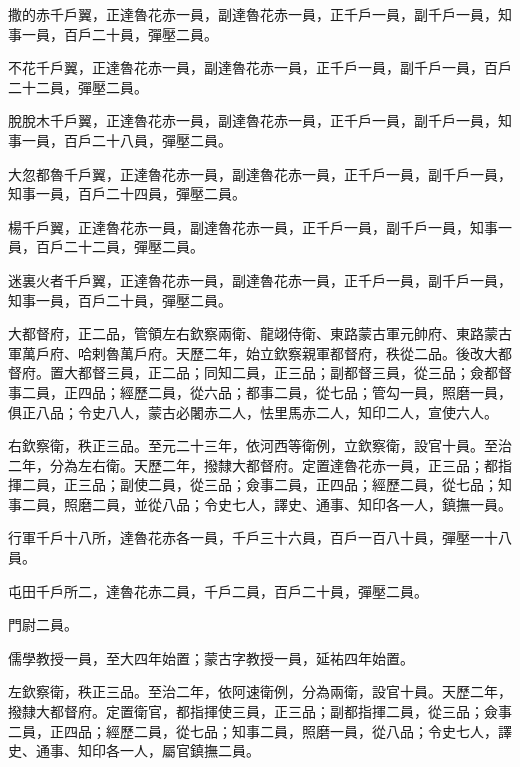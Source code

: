 \begin{pinyinscope}
 撒的赤千戶翼，正達魯花赤一員，副達魯花赤一員，正千戶一員，副千戶一員，知事一員，百戶二十員，彈壓二員。



 不花千戶翼，正達魯花赤一員，副達魯花赤一員，正千戶一員，副千戶一員，百戶二十二員，彈壓二員。



 脫脫木千戶翼，正達魯花赤一員，副達魯花赤一員，正千戶一員，副千戶一員，知事一員，百戶二十八員，彈壓二員。



 大忽都魯千戶翼，正達魯花赤一員，副達魯花赤一員，正千戶一員，副千戶一員，知事一員，百戶二十四員，彈壓二員。



 楊千戶翼，正達魯花赤一員，副達魯花赤一員，正千戶一員，副千戶一員，知事一員，百戶二十二員，彈壓二員。



 迷裏火者千戶翼，正達魯花赤一員，副達魯花赤一員，正千戶一員，副千戶一員，知事一員，百戶二十員，彈壓二員。



 大都督府，正二品，管領左右欽察兩衛、龍翊侍衛、東路蒙古軍元帥府、東路蒙古軍萬戶府、哈剌魯萬戶府。天歷二年，始立欽察親軍都督府，秩從二品。後改大都督府。置大都督三員，正二品；同知二員，正三品；副都督三員，從三品；僉都督事二員，正四品；經歷二員，從六品；都事二員，從七品；管勾一員，照磨一員，俱正八品；令史八人，蒙古必闍赤二人，怯里馬赤二人，知印二人，宣使六人。



 右欽察衛，秩正三品。至元二十三年，依河西等衛例，立欽察衛，設官十員。至治二年，分為左右衛。天歷二年，撥隸大都督府。定置達魯花赤一員，正三品；都指揮二員，正三品；副使二員，從三品；僉事二員，正四品；經歷二員，從七品；知事二員，照磨二員，並從八品；令史七人，譯史、通事、知印各一人，鎮撫一員。



 行軍千戶十八所，達魯花赤各一員，千戶三十六員，百戶一百八十員，彈壓一十八員。



 屯田千戶所二，達魯花赤二員，千戶二員，百戶二十員，彈壓二員。



 門尉二員。



 儒學教授一員，至大四年始置；蒙古字教授一員，延祐四年始置。



 左欽察衛，秩正三品。至治二年，依阿速衛例，分為兩衛，設官十員。天歷二年，撥隸大都督府。定置衛官，都指揮使三員，正三品；副都指揮二員，從三品；僉事二員，正四品；經歷二員，從七品；知事二員，照磨一員，從八品；令史七人，譯史、通事、知印各一人，屬官鎮撫二員。




\end{pinyinscope}
